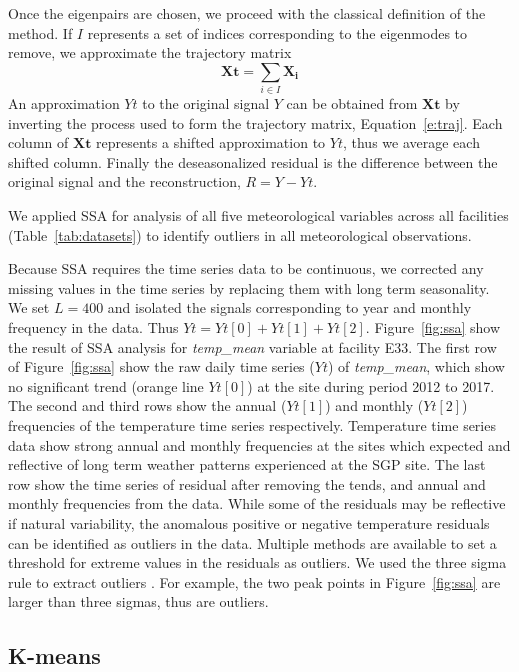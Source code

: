 Once the eigenpairs are chosen, we proceed with the classical definition
of the method. If $I$ represents a set of indices corresponding to the
eigenmodes to remove, we approximate the trajectory matrix
%
\begin{equation*}
    \mathbf{Xt} = \sum_{i\in I} \mathbf{X_i}
\end{equation*}
%
An approximation $Yt$ to the original signal $Y$ can be obtained from
$\mathbf{Xt}$ by inverting the process used to form the trajectory
matrix, Equation~\eqref{e:traj}. Each column of $\mathbf{Xt}$ represents
a shifted approximation to $Yt$, thus we average each shifted column.
Finally the deseasonalized residual is the difference between the
original signal and the reconstruction, $R=Y-Yt$.

We applied SSA for analysis of all five meteorological variables across
all facilities (Table~\ref{tab:datasets}) to identify outliers in all
meteorological observations.

Because SSA requires the time series data to be continuous, 
we corrected any missing values in the time series by replacing them
with long term seasonality. 
We set $L = 400$ and isolated the signals corresponding to year and
monthly frequency in the data.
Thus $Yt = Yt[0] + Yt[1] + Yt[2]$.
Figure~\ref{fig:ssa} show the result of SSA analysis for
\textit{temp\_mean} variable at facility E33. The first row of
Figure~\ref{fig:ssa} show the raw daily time series ($Yt$) of
\textit{temp\_mean}, which show no significant trend (orange line
$Yt[0]$) at the site during period 2012 to 2017.
The second and third rows show the annual ($Yt[1]$) and monthly
($Yt[2]$) frequencies of the temperature time series respectively. 
Temperature time series data show strong annual and monthly frequencies
at the sites which expected and reflective of long term weather patterns
experienced at the SGP site. 
The last row show the time series of residual after removing the tends,
and annual and monthly frequencies from the data. While some of the
residuals may be reflective if natural variability, the
anomalous positive or negative temperature residuals can be identified
as outliers in the data. Multiple methods are available to set a threshold 
for extreme values in the residuals as outliers. We used the three sigma 
rule to extract outliers \cite{pukelsheim1994three}. For example, the two
peak points in Figure~\ref{fig:ssa} are larger than three sigmas, 
thus are outliers.

\subsection{K-means}

